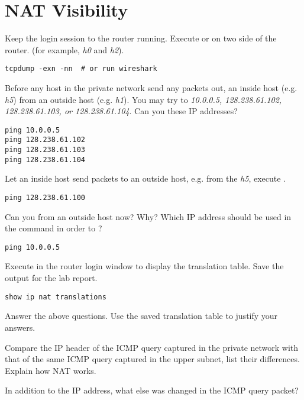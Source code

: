 \documentclass{../UTNetLab}
\begin{document}
\section{NAT Visibility}
Keep the login session to the router running.
Execute  or  on two side of the router.
(for example, \textit{h0} and  \textit{h2}).

\begin{lstlisting}
tcpdump -exn -nn  # or run wireshark
\end{lstlisting}


Before any host in the private network send any packets out,  an inside host (e.g. \textit{h5}) from an outside host (e.g. \textit{h1}).
You may try to  \textit{10.0.0.5, 128.238.61.102, 128.238.61.103, or 128.238.61.104}.
Can you  these IP addresses?

\begin{lstlisting}
ping 10.0.0.5
ping 128.238.61.102
ping 128.238.61.103
ping 128.238.61.104
\end{lstlisting}


Let an inside host send packets to an outside host, e.g. from the \textit{h5}, execute .

\begin{lstlisting}
ping 128.238.61.100
\end{lstlisting}

Can you  from an outside host now? Why? Which IP address should be used in the  command in order to ?

\begin{lstlisting}
ping 10.0.0.5
\end{lstlisting}

Execute  in the router login window to display the translation table.
Save the output for the lab report.

\begin{lstlisting}[language={cisco}, frame=trBL]
show ip nat translations
\end{lstlisting}

\begin{report}
    \item Answer the above questions.
    Use the saved translation table to justify your answers.

    \item Compare the IP header of the ICMP query captured in the private network with that of the same ICMP query captured in the upper subnet, list their differences.
    Explain how NAT works.

    \item In addition to the IP address, what else was changed in the ICMP query packet?
\end{report}
\end{document}
